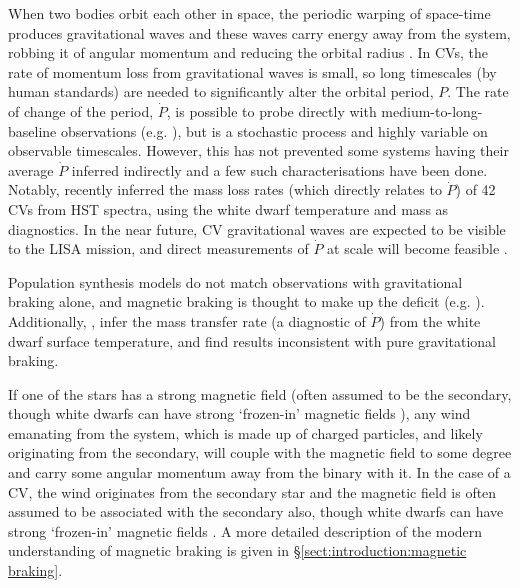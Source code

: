 When two bodies orbit each other in space, the periodic warping of space-time produces gravitational waves \citep{einstein1918} and these waves carry energy away from the system, robbing it of angular momentum and reducing the orbital radius \citep{Paczynski1967}. In CVs, the rate of momentum loss from gravitational waves is small, so long timescales (by human standards) are needed to significantly alter the orbital period, $P$.
The rate of change of the period, $\dot P$, is possible to probe directly with medium-to-long-baseline observations (e.g. \citealt{qian2007, shafter2021}), but is a stochastic process and highly variable on observable timescales. However, this has not prevented some systems having their average $\dot P$ inferred indirectly and a few such characterisations have been done. 
Notably, \citet{pala2020} recently inferred the mass loss rates (which directly relates to $\dot P$) of 42 CVs from HST spectra, using the white dwarf temperature and mass as diagnostics. 
In the near future, CV gravitational waves are expected to be visible to the LISA mission, and direct measurements of $\dot P$ at scale will become feasible \citep{Meliani2000, kalomeni2016}. 

Population synthesis models do not match observations with gravitational braking alone, and magnetic braking is thought to make up the deficit (e.g. \citet{kolb1993a, kolb1993, Davis2008, garraffo2018}).
Additionally, \citet{Townsley2009}, \citet{Pala2021} infer the mass transfer rate (a diagnostic of $\dot P$) from the white dwarf surface temperature, and find results inconsistent with pure gravitational braking.

If one of the stars has a strong magnetic field (often assumed to be the secondary, though white dwarfs can have strong `frozen-in' magnetic fields \citep{TOUT2011}), any wind emanating from the system, which is made up of charged particles, and likely originating from the secondary, will couple with the magnetic field to some degree and carry some angular momentum away from the binary with it.
In the case of a CV, the wind originates from the secondary star and the magnetic field is often assumed to be associated with the secondary also, though white dwarfs can have strong `frozen-in' magnetic fields \citep{TOUT2011}.
A more detailed description of the modern understanding of magnetic braking is given in \S\ref{sect:introduction:magnetic braking}.


